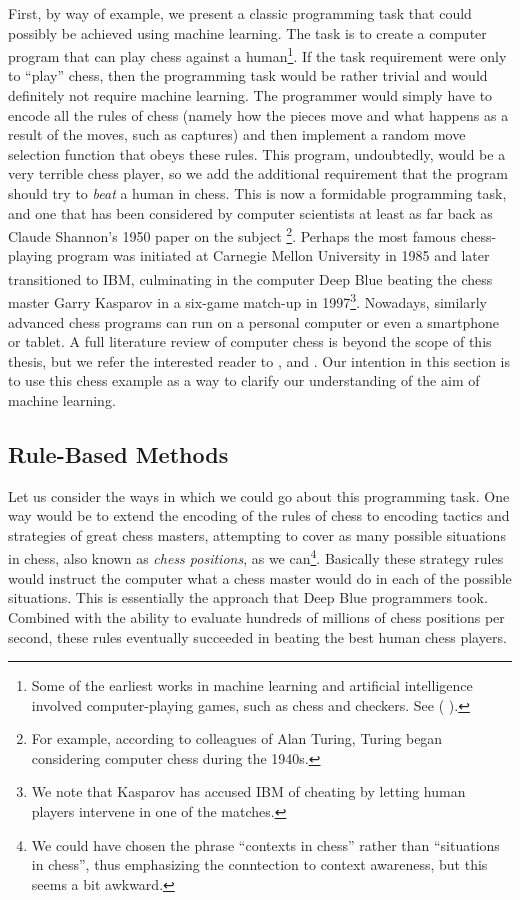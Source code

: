 First, by way of example, we present a classic programming task that could possibly be achieved using machine learning. The task is to create a computer program that can play chess against a human\footnote{Some of the earliest works in machine learning and artificial intelligence involved computer-playing games, such as chess and checkers. See (\cite{samuel1959some} \cite{shannon1950xxii} \cite{Turing1953}).}. If the task requirement were only to ``play'' chess, then the programming task would be rather trivial and would definitely not require machine learning. The programmer would simply have to encode all the rules of chess (namely how the pieces move and what happens as a result of the moves, such as captures) and then implement a random move selection function that obeys these rules. This program, undoubtedly, would be a very terrible chess player, so we add the additional requirement that the program should try to \emph{beat} a human in chess. This is now a formidable programming task, and one that has been considered by computer scientists at least as far back as Claude Shannon's 1950 paper on the subject \cite{shannon1950xxii}\footnote{For example, according to colleagues of Alan Turing, Turing began considering computer chess during the 1940s.}. Perhaps the most famous chess-playing program was initiated at Carnegie Mellon University in 1985 and later transitioned to IBM, culminating in the computer Deep Blue\textsuperscript{\textregistered} beating the chess master Garry Kasparov in a six-game match-up in 1997\footnote{We note that Kasparov has accused IBM of cheating by letting human players intervene in one of the matches.}. Nowadays, similarly advanced chess programs can run on a personal computer or even a smartphone or tablet. A full literature review of computer chess is beyond the scope of this thesis, but we refer the interested reader to \cite{hsu2002behind} \cite{Spicer2006}, and \cite{Russell2010}. Our intention in this section is to use this chess example as a way to clarify our understanding of the aim of machine learning.

\subsection{Rule-Based Methods}
\label{sec:rule-based}

Let us consider the ways in which we could go about this programming task. One way would be to extend the encoding of the rules of chess to encoding tactics and strategies of great chess masters, attempting to cover as many possible situations in chess, also known as \emph{chess positions}, as we can\footnote{We could have chosen the phrase ``contexts in chess'' rather than ``situations in chess'', thus emphasizing the conntection to context awareness, but this seems a bit awkward.}. Basically these strategy rules would instruct the computer what a chess master would do in each of the possible situations. This is essentially the approach that Deep Blue programmers took. Combined with the ability to evaluate hundreds of millions of chess positions per second, these rules eventually succeeded in beating the best human chess players.

